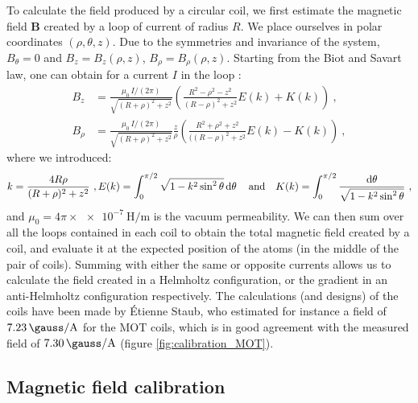 \documentclass[11pt]{article}
\numberwithin{equation}{section}
\numberwithin{figure}{section}
\begin{document}
To calculate the field produced by a circular coil, we first estimate the magnetic field $\mathbf{B}$ created by a loop of current of radius $R$. We place ourselves in polar coordinates $(\rho, \theta, z)$. Due to the symmetries and invariance of the system, $B_\theta = 0$ and $B_z = B_z(\rho, z)$, $B_\rho = B_\rho(\rho, z)$. Starting from the Biot and Savart law, one can obtain for a current $I$ in the loop \citep{1987_bergeman}:
\begin{align}
    B_z & = \frac{\mu_0 \, I / (2 \pi) }{\sqrt{(R + \rho)^2 + z^2}}  \left( \frac{R^2 - \rho^2 - z^2}{(R - \rho)^2 + z^2}  E(k) + K(k) \right)~, \\
   B_\rho  &= \frac{\mu_0 \, I / (2 \pi) }{\sqrt{(R + \rho)^2 + z^2}}  \frac{z}{\rho}  \left( \frac{R^2 + \rho^2 + z^2}{((R - \rho)^2 + z^2}  E(k) - K(k) \right)~,
\end{align}
where we introduced:
%
\begin{equation*}
k =\frac{ 4 R \rho}{(R + \rho)^2 + z^2}~, E(k) = \int_0^{\pi/2} \sqrt{1 - k^2 \sin^2 \theta} \dd{\theta} \qq{and} K(k) = \int_0^{\pi/2} \frac{\dd{\theta}}{\sqrt{1 - k^2 \sin^2 \theta}}~,
\end{equation*}
%
and $\mu_0 = 4 \pi \times \SI{e-7}{\henry\per\metre}$ is the vacuum permeability. We can then sum over all the loops contained in each coil to obtain the total magnetic field created by a coil, and evaluate it at the expected position of the atoms (in the middle of the pair of coils). Summing with either the same or opposite currents allows us to calculate the field created in a Helmholtz configuration, or the gradient in an anti-Helmholtz configuration respectively. 
The calculations (and designs) of the coils have been made by \'Etienne Staub, who estimated for instance a field of $\SI{7.23}{\gauss\per\ampere}$ for the MOT coils, which is in good agreement with the measured field of $\SI{7.30}{\gauss\per\ampere}$ (figure \ref{fig:calibration_MOT}). 

\subsection{Magnetic field calibration}
\end{document}
